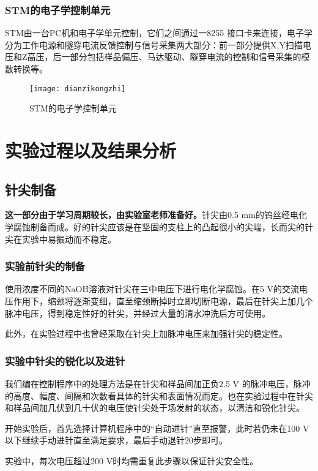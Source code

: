 \documentclass[aps,pre,12pt,preprint,onecolumn,showpacs,showkeys]{revtex4-1}
\begin{document}
\subsubsection{STM的电子学控制单元}
STM由一台PC机和电子学单元控制，它们之间通过一8255 接口卡来连接，电子学分为工作电源和隧穿电流反馈控制与信号采集两大部分：前一部分提供X,Y扫描电压和Z高压，后一部分包括样品偏压、马达驱动、隧穿电流的控制和信号采集的模数转换等。
\begin{figure}[h]
\centering
\texttt{[image: dianzikongzhi]}
\centering
\caption{\label{fig:图2}%
STM的电子学控制单元}
\end{figure}




\section{实验过程以及结果分析}
\subsection{针尖制备}
\textbf{这一部分由于学习周期较长，由实验室老师准备好。}针尖由0.5 mm的钨丝经电化学腐蚀制备而成。好的针尖应该是在坚固的支柱上的凸起很小的尖端，长而尖的针尖在实验中易振动而不稳定。
\subsubsection{实验前针尖的制备}
使用浓度不同的NaOH溶液对针尖在三中电压下进行电化学腐蚀。在5 V的交流电压作用下，缩颈将逐渐变细，直至缩颈断掉时立即切断电源，最后在针尖上加几个脉冲电压，得到稳定性好的针尖，并经过大量的清水冲洗后方可使用。\par
此外，在实验过程中也曾经采取在针尖上加脉冲电压来加强针尖的稳定性。
\subsubsection{实验中针尖的锐化以及进针}
我们编在控制程序中的处理方法是在针尖和样品间加正负2.5 V 的脉冲电压，脉冲的高度、幅度、间隔和次数看具体的针尖和表面情况而定。也在实验过程中在针尖和样品间加几伏到几十伏的电压使针尖处于场发射的状态，以清洁和锐化针尖。\par
开始实验后，首先选择计算机程序中的“自动进针”直至报警，此时若仍未在100 V以下继续手动进针直至满足要求，最后手动退针20步即可。\par
实验中，每次电压超过200 V时均需重复此步骤以保证针尖安全性。
\end{document}
